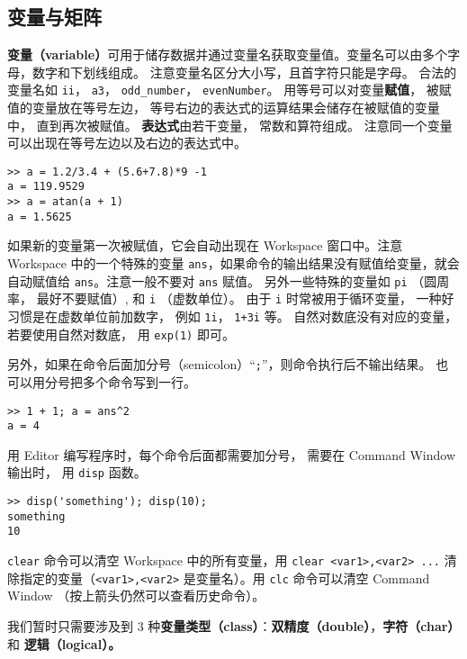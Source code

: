

\subsection{变量与矩阵}
\textbf{变量（variable）}可用于储存数据并通过变量名获取变量值。变量名可以由多个字母，数字和下划线组成。 注意变量名区分大小写，且首字符只能是字母。 合法的变量名如 \verb|ii|， \verb|a3|， \verb|odd_number|， \verb|evenNumber|。 用等号可以对变量\textbf{赋值}， 被赋值的变量放在等号左边， 等号右边的表达式的运算结果会储存在被赋值的变量中， 直到再次被赋值。 \textbf{表达式}由若干变量， 常数和算符组成。 注意同一个变量可以出现在等号左边以及右边的表达式中。
\begin{lstlisting}[language=matlabC]
>> a = 1.2/3.4 + (5.6+7.8)*9 -1
a = 119.9529
>> a = atan(a + 1)
a = 1.5625
\end{lstlisting}
如果新的变量第一次被赋值，它会自动出现在 Workspace 窗口中。注意 Workspace 中的一个特殊的变量 \verb|ans|，如果命令的输出结果没有赋值给变量，就会自动赋值给 \verb|ans|。注意一般不要对 \verb|ans| 赋值。 另外一些特殊的变量如 \verb|pi| （圆周率， 最好不要赋值）, 和 \verb|i| （虚数单位）。 由于 \verb|i| 时常被用于循环变量， 一种好习惯是在虚数单位前加数字， 例如 \verb|1i|， \verb|1+3i| 等。 自然对数底没有对应的变量， 若要使用自然对数底， 用 \verb|exp(1)| 即可。

另外，如果在命令后面加分号（semicolon）“\verb|;|”，则命令执行后不输出结果。 也可以用分号把多个命令写到一行。
\begin{lstlisting}[language=matlabC]
>> 1 + 1; a = ans^2
a = 4
\end{lstlisting}
用 Editor 编写程序时，每个命令后面都需要加分号， 需要在 Command Window 输出时， 用 \verb|disp| 函数。
\begin{lstlisting}[language=matlabC]
>> disp('something'); disp(10);
something
10
\end{lstlisting}

\verb|clear| 命令可以清空 Workspace 中的所有变量，用 \verb|clear <var1>,<var2> ...| 清除指定的变量（\verb|<var1>,<var2>| 是变量名）。用 \verb|clc| 命令可以清空 Command Window （按上箭头仍然可以查看历史命令）。

我们暂时只需要涉及到 3 种\textbf{变量类型（class）}：\textbf{双精度（double）}，\textbf{字符（char）} 和 \textbf{逻辑（logical）。}

